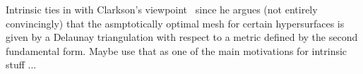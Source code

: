 Intrinsic ties in with Clarkson's viewpoint~\cite{clarkson2006} since
he argues (not entirely convincingly) that the asmptotically optimal
mesh for certain hypersurfaces is given by a Delaunay triangulation
with respect to a metric defined by the second fundamental form. Maybe
use that as one of the main motivations for intrinsic stuff ...









%











